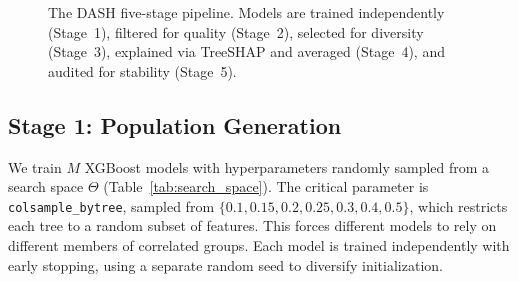 \documentclass[11pt]{article}
\newcommand{\dash}{\textsc{DASH}}
\begin{document}
\begin{figure}[htbp]
\centering
{}
\caption{The \dash{} five-stage pipeline. Models are trained independently
(Stage~1), filtered for quality (Stage~2), selected for diversity (Stage~3),
explained via TreeSHAP and averaged (Stage~4), and audited for stability
(Stage~5).}
\label{fig:pipeline}
\end{figure}

\subsection{Stage 1: Population Generation}

We train $M$ XGBoost \citep{chen2016xgboost} models with hyperparameters randomly sampled from a
search space $\Theta$ (Table~\ref{tab:search_space}). The critical
parameter is \texttt{colsample\_bytree}, sampled from
$\{0.1, 0.15, 0.2, 0.25, 0.3, 0.4, 0.5\}$, which restricts each tree
to a random subset of features. This forces different models to rely on
different members of correlated groups. Each model is trained independently
with early stopping, using a separate random seed to diversify initialization.
\end{document}
